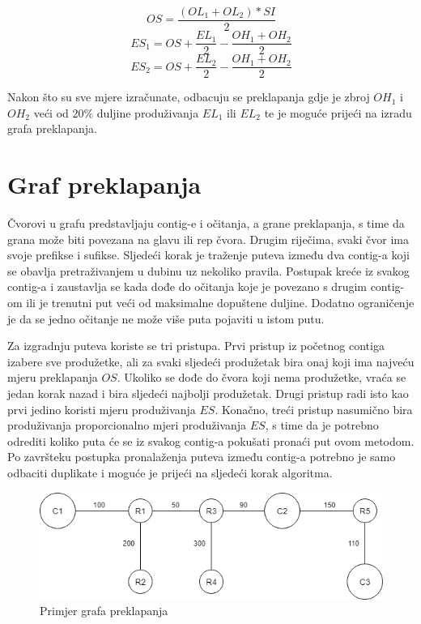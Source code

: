 \begin{equation}
OS = \frac{(OL_1 + OL_2) * SI}{2}
\label{eq:os}
\end{equation}
\begin{equation}
ES_1 = OS + \frac{EL_1}{2} - \frac{OH_1 + OH_2}{2}
\label{eq:es1}
\end{equation}
\begin{equation}
ES_2 = OS + \frac{EL_2}{2} - \frac{OH_1 + OH_2}{2}
\label{eq:es2}
\end{equation}

Nakon što su sve mjere izračunate, odbacuju se preklapanja gdje je zbroj $OH_1$ i $OH_2$ veći od 20\% duljine produživanja $EL_1$ ili $EL_2$ te je moguće prijeći na izradu grafa preklapanja.

\section{Graf preklapanja}
Čvorovi u grafu predstavljaju contig-e i očitanja, a grane preklapanja, s time da grana može biti povezana na glavu ili rep čvora. Drugim riječima, svaki čvor ima svoje prefikse i sufikse. Sljedeći korak je traženje puteva između dva contig-a koji se obavlja pretraživanjem u dubinu  uz nekoliko pravila. Postupak kreće iz svakog contig-a i zaustavlja se kada dođe do očitanja koje je povezano s drugim contig-om ili je trenutni put veći od maksimalne dopuštene duljine. Dodatno ograničenje je da se jedno očitanje ne može više puta pojaviti u istom putu.

Za izgradnju puteva koriste se tri pristupa. Prvi pristup iz početnog contiga izabere sve produžetke, ali za svaki sljedeći produžetak bira onaj koji ima najveću mjeru preklapanja $OS$. Ukoliko se dođe do čvora koji nema produžetke, vraća se jedan korak nazad i bira sljedeći najbolji produžetak. Drugi pristup radi isto kao prvi jedino koristi mjeru produživanja $ES$. Konačno, treći pristup nasumično bira produživanja proporcionalno mjeri produživanja $ES$, s time da je potrebno odrediti koliko puta će se iz svakog contig-a pokušati pronaći put ovom metodom. Po završteku postupka pronalaženja puteva između contig-a potrebno je samo odbaciti duplikate i moguće je prijeći na sljedeći korak algoritma.

\begin{figure}[htb]
\centering
\includegraphics[width=\textwidth]{img/graph.png}
\caption{Primjer grafa preklapanja}
\label{fig:graph}
\end{figure}

